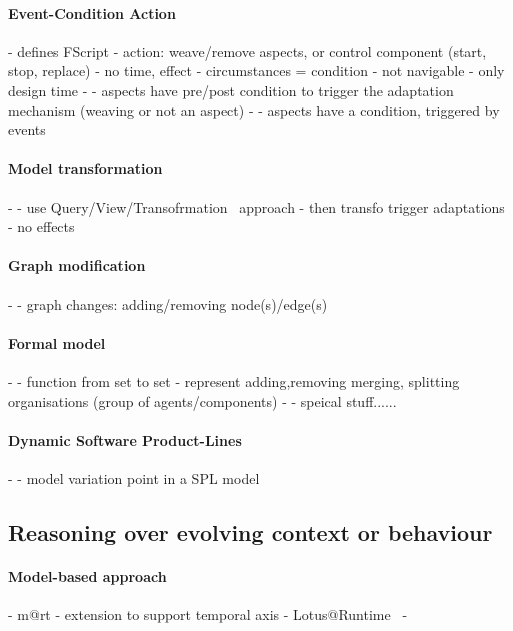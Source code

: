 \paragraph{Event-Condition Action}
- \cite{DBLP:conf/soco/DavidL06} defines FScript
	- action: weave/remove aspects, or control component (start, stop, replace)
 	- no time, effect
 	- circumstances = condition
 	- not navigable
 	- only design time
- \cite{DBLP:conf/icws/CharfiDM09}
	- aspects have pre/post condition to trigger the adaptation mechanism (weaving or not an aspect) 
- \cite{DBLP:journals/scp/ParraBCD11}
	- aspects have a condition, triggered by events
	
\paragraph{Model transformation}
- \cite{DBLP:conf/icse/ChenPYNZ14}
	- use Query/View/Transofrmation~\cite{QVT:Spec} approach
	- then transfo trigger adaptations
	- no effects
	
\paragraph{Graph modification}
- \cite{DBLP:journals/tse/KramerM90}
	- graph changes: adding/removing node(s)/edge(s)
	
\paragraph{Formal model}
- \cite{DBLP:journals/taas/WeynsHH10}
	- function from set to set
	- represent adding,removing merging, splitting organisations (group of agents/components)
- \cite{DBLP:conf/icse/BartelsK11}
	- speical stuff......
	
\paragraph{Dynamic Software Product-Lines}
- \cite{DBLP:conf/dagstuhl/GhezziS10}
	- model variation point in a SPL model
	 
	 
	 
	 
	 
\subsection{Reasoning over evolving context or behaviour}

\paragraph{Model-based approach}
- \gls{m@rt} \cite{DBLP:journals/computer/BlairBF09, DBLP:journals/computer/MorinBJFS09}
	- extension to support temporal axis \cite{DBLP:conf/seke/0001FNMKT14, DBLP:conf/models/0001FNMKBT14}
- Lotus@Runtime~\cite{DBLP:conf/icse/BarbosaLMJ17}
- \cite{DBLP:conf/icse/ChenPYNZ14}
		
